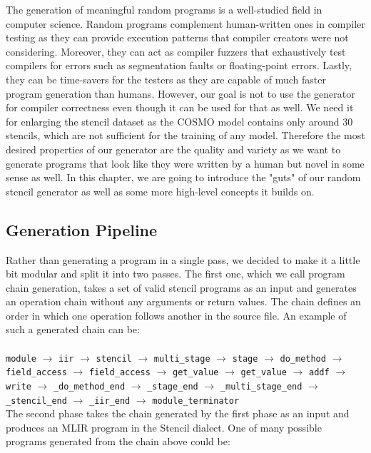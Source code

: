 \documentclass[sigplan,\review anonymous]{acmart}
\begin{document}
The generation of meaningful random programs is a well-studied field in
computer science. Random programs complement human-written ones in compiler
testing as they can provide execution patterns that compiler creators were not
considering. Moreover, they can act as compiler fuzzers that exhaustively test
compilers for errors such as segmentation faults or floating-point errors.
Lastly, they can be time-savers for the testers as they are capable of much
faster program generation than humans. However, our goal is not to use the
generator for compiler correctness even though it can be used for that as
well. We need it for enlarging the stencil dataset as the COSMO model contains
only around 30 stencils, which are not sufficient for the training of any
model. Therefore the most desired properties of our generator are the quality
and variety as we want to generate programs that look like they were written
by a human but novel in some sense as well. In this chapter, we are going to
introduce the "guts" of our random stencil generator as well as some more
high-level concepts it builds on. 

\subsection{Generation Pipeline}
Rather than generating a program in a single pass, we decided to make it a
little bit modular and split it into two passes. The first one, which we call
program chain generation, takes a set of valid stencil programs as an input
and generates an operation chain without any arguments or return values. The
chain defines an order in which one operation follows another in the source
file. An example of such a generated chain can be:\\\\
\label{chain}
\texttt{module} $\rightarrow$
\texttt{iir} $\rightarrow$
\texttt{stencil} $\rightarrow$
\texttt{multi\_stage} $\rightarrow$
\texttt{stage} $\rightarrow$
\texttt{do\_method} $\rightarrow$ \\
\texttt{field\_access} $\rightarrow$
\texttt{field\_access} $\rightarrow$
\texttt{get\_value} $\rightarrow$
\texttt{get\_value} $\rightarrow$
\texttt{addf} $\rightarrow$
\texttt{write} $\rightarrow$
\texttt{\_do\_method\_end} $\rightarrow$
\texttt{\_stage\_end} $\rightarrow$
\texttt{\_multi\_stage\_end} $\rightarrow$
\texttt{\_stencil\_end} $\rightarrow$
\texttt{\_iir\_end} $\rightarrow$
\texttt{module\_terminator}\\

\noindent The second phase takes the chain generated by the first phase as
an input and produces an MLIR program in the Stencil dialect.
One of many possible programs generated from the chain above could be:
\end{document}
